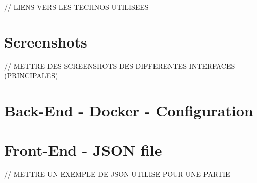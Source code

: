 \documentclass{tnreport}
\begin{document}
// LIENS VERS LES TECHNOS UTILISEES

\cleardoublepage

\chapter{Screenshots}

// METTRE DES SCREENSHOTS DES DIFFERENTES INTERFACES (PRINCIPALES) \\

\cleardoublepage

\chapter{Back-End - Docker - Configuration}
\label{annexe:docker_compose}
\vspace{0.5cm}
\begin{center}
	\vspace*{-0.8in}
	
\end{center}

\cleardoublepage

\chapter{Front-End - JSON file}

// METTRE UN EXEMPLE DE JSON UTILISE POUR UNE PARTIE \\
\end{document}
